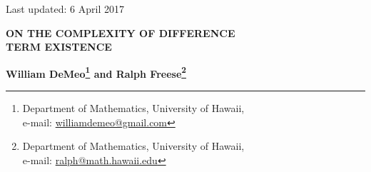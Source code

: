 \begin{flushright}
\vspace*{-1.1cm} {{\small \sffamily Last updated: 6 April 2017}}
\end{flushright}
\vspace{0.8cm}
\begin{center}
{\large \bf ON THE COMPLEXITY OF DIFFERENCE\\ TERM EXISTENCE
} \vspace*{3mm}


{\bf William DeMeo\footnote{Department of Mathematics, University of Hawaii,\\
    e-mail: \href{mailto:williamdemeo@gmail.com}{williamdemeo@gmail.com}}
and Ralph Freese\footnote{Department of Mathematics, University of Hawaii,\\
    e-mail: \href{mailto:ralph@math.hawaii.edu}{ralph@math.hawaii.edu}}}
\end{center}

\begin{abstract}
We consider the following practical question: given a finite algebra $\bA$ in a
finite language, can we efficiently decide whether the variety generated by
$\bA$ has a difference term?  We define %
``local difference terms'' and used to solve
a related but easier problem---namely, we show that
there is a polynomial-time algorithm for deciding whether any finite idempotent
algebra has a difference term operation.
Thereafter, we define ``global-local difference terms'' which we use to
make some progress toward an efficient algorithm for deciding whether the
variety generated by a finite idempotent algebra has a difference term.
\\[2mm] {\it AMS Mathematics  Subject Classification $(2000)$}: 08B05, 08B10, 68Q25
\\[1mm] {\it Key words:} difference term, idempotent algebra, commutator

\end{abstract}

